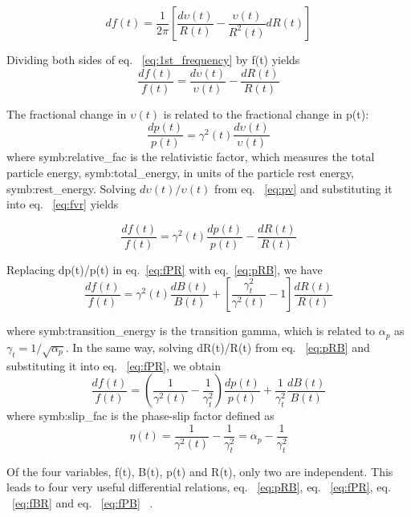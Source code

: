 \begin{equation}
\label{eq:1st_frequency}
df(t)=\frac{1}{2\pi}[\frac{d\upsilon(t)}{R(t)}- \frac{\upsilon(t)}{R^2(t)}dR(t)]
\end{equation}

Dividing both sides of eq. ~\ref{eq:1st_frequency} by f(t) yields
\begin{equation}
\label{eq:fvr}
\frac{df(t)}{f(t)}=\frac{d\upsilon(t)}{\upsilon(t)}- \frac{dR(t)}{R(t)}
\end{equation}

The fractional change in $\upsilon(t)$ is related to the fractional change in p(t):
\begin{equation}
\label{eq:pv}
\frac{dp(t)}{p(t)}=\gamma^2(t)\frac{d\upsilon(t)}{\upsilon(t)}
\end{equation}
where \gls{symb:relative_fac} is the relativistic factor, which measures the total particle energy, \gls{symb:total_energy}, in units of the particle rest energy, \gls{symb:rest_energy}. Solving $d\upsilon(t)/\upsilon(t)$ from eq. ~\ref{eq:pv} and substituting it into eq. ~\ref{eq:fvr} yields

\begin{equation}
\label{eq:fPR}
\frac{df(t)}{f(t)} ={\gamma^2(t)}\frac{dp(t)}{p(t)}-\frac{dR(t)}{R(t)} 
\end{equation}

Replacing dp(t)/p(t) in eq.~\ref{eq:fPR} with eq.~\ref{eq:pRB}, we have
\begin{equation}
\label{eq:fBR}
\frac{df(t)}{f(t)} ={\gamma^2(t)}\frac{dB(t)}{B(t)}+[\frac{\gamma_t^2}{\gamma^2(t)}-1]\frac{dR(t)}{R(t)} 
\end{equation}

where \gls{symb:transition_energy} is the transition gamma, which is related to $\alpha_p$ as $\gamma_t=1/\sqrt{\alpha_p}$. In the same way, solving dR(t)/R(t) from eq. ~\ref{eq:pRB} and substituting it into eq. ~\ref{eq:fPR}, we obtain
\begin{equation}
\label{eq:fPB}
\frac{df(t)}{f(t)} =(\frac{1}{\gamma^2(t)}-\frac{1}{\gamma_t^2}) \frac{dp(t)}{p(t)}+\frac{1}{\gamma_t^2}\frac{dB(t)}{B(t)} 
\end{equation}
where \gls{symb:slip_fac} is the phase-slip factor defined as
\begin{equation}
\label{eq:phse_slip}
\eta(t) =\frac{1}{\gamma^2(t)}-\frac{1}{\gamma_t^2}=\alpha_p-\frac{1}{\gamma_t^2}
\end{equation}


Of the four variables, f(t), B(t), p(t) and R(t), only two are independent. This leads to four very useful differential relations, eq. ~\ref{eq:pRB}, eq. ~\ref{eq:fPR}, eq. ~\ref{eq:fBR} and eq. ~\ref{eq:fPB} ~\cite{ezura_beam-dynamics_2008, bovet_selection_1970}. 

